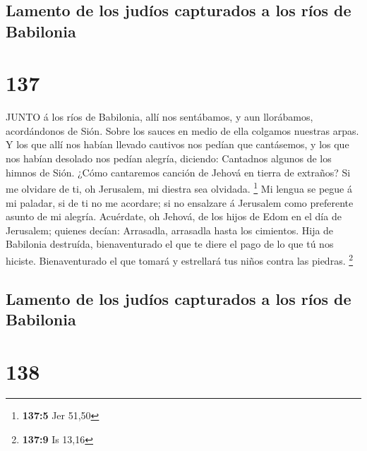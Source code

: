 \hypertarget{lamento-de-los-juduxedos-capturados-a-los-ruxedos-de-babilonia}{%
\subsection{Lamento de los judíos capturados a los ríos de
Babilonia}\label{lamento-de-los-juduxedos-capturados-a-los-ruxedos-de-babilonia}}

\hypertarget{section-136}{%
\section{137}\label{section-136}}

 JUNTO á los ríos de Babilonia, allí nos sentábamos, y aun
llorábamos, acordándonos de Sión.  Sobre los sauces en medio
de ella colgamos nuestras arpas.  Y los que allí nos habían
llevado cautivos nos pedían que cantásemos, y los que nos habían
desolado nos pedían alegría, diciendo:  Cantadnos algunos de
los himnos de Sión. ¿Cómo cantaremos canción de Jehová en tierra de
extraños?  Si me olvidare de ti, oh Jerusalem, mi diestra
sea olvidada. \footnote{\textbf{137:5} Jer 51,50}  Mi lengua
se pegue á mi paladar, si de ti no me acordare; si no ensalzare á
Jerusalem como preferente asunto de mi alegría.  Acuérdate,
oh Jehová, de los hijos de Edom en el día de Jerusalem; quienes decían:
Arrasadla, arrasadla hasta los cimientos.  Hija de Babilonia
destruída, bienaventurado el que te diere el pago de lo que tú nos
hiciste.  Bienaventurado el que tomará y estrellará tus
niños contra las piedras. \footnote{\textbf{137:9} Is 13,16}

\hypertarget{lamento-de-los-juduxedos-capturados-a-los-ruxedos-de-babilonia-1}{%
\subsection{Lamento de los judíos capturados a los ríos de
Babilonia}\label{lamento-de-los-juduxedos-capturados-a-los-ruxedos-de-babilonia-1}}

\hypertarget{section-137}{%
\section{138}\label{section-137}}


